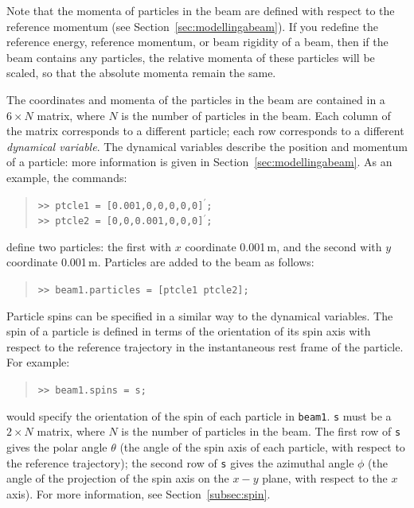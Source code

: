 \documentclass[11pt,twoside,a4paper]{article}
\begin{document}
Note that the momenta of particles in the beam are defined with respect to
the reference momentum (see Section~\ref{sec:modellingabeam}).  If you
redefine the reference energy, reference momentum, or beam rigidity of a 
beam, then if the beam contains any particles, the relative momenta of these
particles will be scaled, so that the absolute momenta remain the same.

The coordinates and momenta of the particles in the beam are contained in a
$6\times N$ matrix, where $N$ is the number of particles in the beam.  Each
column of the matrix corresponds to a different particle; each row corresponds
to a different \emph{dynamical variable}.  The dynamical variables describe
the position and momentum of a particle: more information is given in
Section~\ref{sec:modellingabeam}.  As an example, the commands:
\begin{quote}
\texttt{>> ptcle1 = [0.001,0,0,0,0,0]$^\prime$; \\
>> ptcle2 = [0,0,0.001,0,0,0]$^\prime$;}
\end{quote}
define two particles: the first with $x$ coordinate 0.001\,m, and the second
with $y$ coordinate 0.001\,m.  Particles are added to the beam as follows:
\begin{quote}
\texttt{>> beam1.particles = [ptcle1 ptcle2];}
\end{quote}

Particle spins can be specified in a similar way to the dynamical variables.
The spin of a particle is defined in terms of the orientation of its spin axis with
respect to the reference trajectory in the instantaneous rest frame of the
particle.  For example:
\begin{quote}
\texttt{>> beam1.spins = s;}
\end{quote}
would specify the orientation of the spin of each particle in \texttt{beam1}.
\texttt{s} must be a $2\times N$ matrix, where $N$ is the number of particles
in the beam.  The first row of \texttt{s} gives the polar angle $\theta$ (the
angle of the spin axis of each particle, with respect to the reference trajectory);
the second row of \texttt{s} gives the azimuthal angle $\phi$ (the angle of the
projection of the spin axis on the $x-y$ plane, with respect to the $x$ axis).
For more information, see Section~\ref{subsec:spin}.
\end{document}
